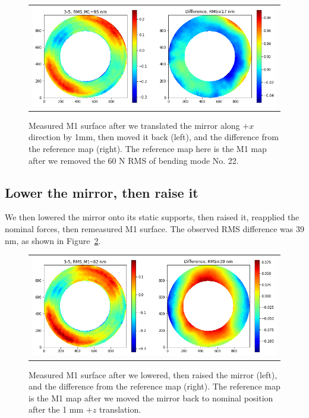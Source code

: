 \documentclass [twoside,openbib,12pt]{article}
\begin{document}
 \begin{figure}[bthp]
   \begin{center}
   \begin{tabular}{c}
\includegraphics[width=120mm]{figures/repeatX.png}
  \end{tabular}
   \end{center}
   \caption
  { \label{fig:repeatX}
Measured M1 surface after we translated the mirror along $+x$
direction by 1mm, then moved it back (left), and the difference from the reference map
(right). The reference map here is the M1 map after we removed the 60
N RMS of bending mode No. 22.
 }
\end{figure}


\subsection{Lower the mirror, then raise it}

We then lowered the mirror onto its static supports, then raised it,
reapplied the nominal forces, 
then remeasured M1 surface. 
The observed RMS difference was 39 nm, as shown in Figure~\ref{fig:lowerRaise}.

 \begin{figure}[bthp]
   \begin{center}
   \begin{tabular}{c}
\includegraphics[width=120mm]{figures/lowerRaise.png}
  \end{tabular}
   \end{center}
   \caption
  { \label{fig:lowerRaise}
Measured M1 surface after we lowered, then raised the mirror (left), and the difference from the reference map
(right). The reference map is the M1 map after we moved the mirror
back to nominal position after the 1 mm $+z$ translation.
 }
\end{figure}
\end{document}
